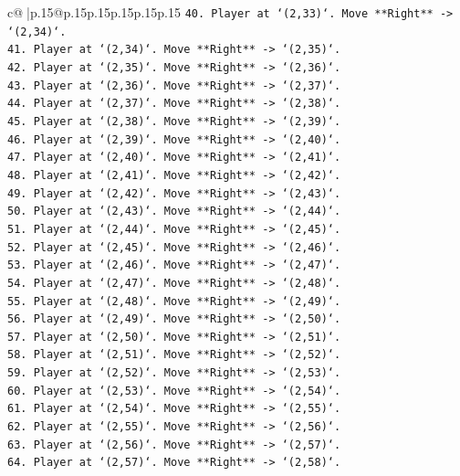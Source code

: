 \documentclass{article}
\begin{document}
{\begin{supertabular}{c@{$\;$}|p{.15\linewidth}@{}p{.15\linewidth}p{.15\linewidth}p{.15\linewidth}p{.15\linewidth}p{.15\linewidth}}
{{{\texttt{40. Player at `(2,33)`. Move **Right** {-}> `(2,34)`.} \\
\texttt{41. Player at `(2,34)`. Move **Right** {-}> `(2,35)`.} \\
\texttt{42. Player at `(2,35)`. Move **Right** {-}> `(2,36)`.} \\
\texttt{43. Player at `(2,36)`. Move **Right** {-}> `(2,37)`.} \\
\texttt{44. Player at `(2,37)`. Move **Right** {-}> `(2,38)`.} \\
\texttt{45. Player at `(2,38)`. Move **Right** {-}> `(2,39)`.} \\
\texttt{46. Player at `(2,39)`. Move **Right** {-}> `(2,40)`.} \\
\texttt{47. Player at `(2,40)`. Move **Right** {-}> `(2,41)`.} \\
\texttt{48. Player at `(2,41)`. Move **Right** {-}> `(2,42)`.} \\
\texttt{49. Player at `(2,42)`. Move **Right** {-}> `(2,43)`.} \\
\texttt{50. Player at `(2,43)`. Move **Right** {-}> `(2,44)`.} \\
\texttt{51. Player at `(2,44)`. Move **Right** {-}> `(2,45)`.} \\
\texttt{52. Player at `(2,45)`. Move **Right** {-}> `(2,46)`.} \\
\texttt{53. Player at `(2,46)`. Move **Right** {-}> `(2,47)`.} \\
\texttt{54. Player at `(2,47)`. Move **Right** {-}> `(2,48)`.} \\
\texttt{55. Player at `(2,48)`. Move **Right** {-}> `(2,49)`.} \\
\texttt{56. Player at `(2,49)`. Move **Right** {-}> `(2,50)`.} \\
\texttt{57. Player at `(2,50)`. Move **Right** {-}> `(2,51)`.} \\
\texttt{58. Player at `(2,51)`. Move **Right** {-}> `(2,52)`.} \\
\texttt{59. Player at `(2,52)`. Move **Right** {-}> `(2,53)`.} \\
\texttt{60. Player at `(2,53)`. Move **Right** {-}> `(2,54)`.} \\
\texttt{61. Player at `(2,54)`. Move **Right** {-}> `(2,55)`.} \\
\texttt{62. Player at `(2,55)`. Move **Right** {-}> `(2,56)`.} \\
\texttt{63. Player at `(2,56)`. Move **Right** {-}> `(2,57)`.} \\
\texttt{64. Player at `(2,57)`. Move **Right** {-}> `(2,58)`.} \\
}}}
\end{supertabular}}
\end{document}

